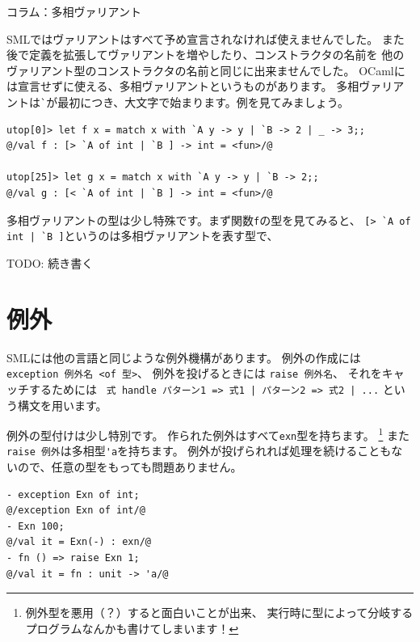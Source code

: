 \documentclass[11pt,a4paper]{article}
\begin{document}
\begin{itembox}[l]{コラム：多相ヴァリアント}

SMLではヴァリアントはすべて予め宣言されなければ使えませんでした。
また後で定義を拡張してヴァリアントを増やしたり、コンストラクタの名前を
他のヴァリアント型のコンストラクタの名前と同じに出来ませんでした。
OCaml\cite{ocaml}には宣言せずに使える、多相ヴァリアントというものがあります。
多相ヴァリアントは\lstinline{`}が最初につき、大文字で始まります。例を見てみましょう。

\begin{lstlisting}[caption=多相ヴァリアント,label=code:poly-varinat]
utop[0]> let f x = match x with `A y -> y | `B -> 2 | _ -> 3;;
@/val f : [> `A of int | `B ] -> int = <fun>/@

utop[25]> let g x = match x with `A y -> y | `B -> 2;;
@/val g : [< `A of int | `B ] -> int = <fun>/@
\end{lstlisting}

多相ヴァリアントの型は少し特殊です。まず関数\lstinline{f}の型を見てみると、
\lstinline{[> `A of int | `B ]}というのは多相ヴァリアントを表す型で、

TODO: 続き書く

\end{itembox}

\section{例外}

SMLには他の言語と同じような例外機構があります。
例外の作成には \lstinline{exception 例外名 <of 型>}、
例外を投げるときには \lstinline{raise 例外名}、
それをキャッチするためには
\lstinline{ 式 handle パターン1 => 式1 | パターン2 => 式2 | ...}
という構文を用います。

例外の型付けは少し特別です。
作られた例外はすべて\lstinline{exn}型を持ちます。
\footnote{例外型を悪用（？）すると面白いことが出来、
実行時に型によって分岐するプログラムなんかも書けてしまいます\cite{use-exn}！}
また\lstinline{raise 例外}は多相型\lstinline{'a}を持ちます。
例外が投げられれば処理を続けることもないので、任意の型をもっても問題ありません。

\begin{minipage}[htb]{0.4\linewidth}
\begin{lstlisting}[caption=例外の型付け]
- exception Exn of int;
@/exception Exn of int/@
- Exn 100;
@/val it = Exn(-) : exn/@
- fn () => raise Exn 1;
@/val it = fn : unit -> 'a/@
\end{lstlisting}
\end{minipage}
\end{document}
